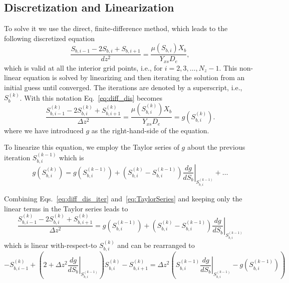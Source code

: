 \documentclass[letterpaper, twoside]{article}
\newcommand{\ie}{i.e.}
\begin{document}
\subsection{Discretization and Linearization}
To solve it we use the direct, finite-difference method, which leads to the following discretized equation
\begin{equation} \label{eq:diff_dis}
  \frac{ S_{b,i-1} - 2 S_{b,i} + S_{b,i+1}}{dz^2} = \frac{\mu(S_{b,i}) X_b}{Y_{xs} D_e},
\end{equation}
which is valid at all the interior grid points, \ie, for $i=2,3,\dots,N_z-1$. 
This non-linear equation is solved by linearizing and then iterating the solution from an initial guess until converged.
The iterations are denoted by a superscript, \ie, $S_{b}^{(k)}$.  With this notation Eq.~\ref{eq:diff_dis} becomes
\begin{equation} \label{eq:diff_dis_iter}
  \frac{ S_{b,i-1}^{(k)} - 2 S_{b,i}^{(k)} + S_{b,i+1}^{(k)}}{\Delta z^2} = \frac{\mu\left(S_{b,i}^{(k)}\right) X_b}{Y_{xs} D_e} =  g\left(S_{b,i}^{(k)}\right).
\end{equation}
where we have introduced $g$ as the right-hand-side of the equation.

To linearize this equation, we employ the Taylor series of $g$ about the previous iteration $S_{b,i}^{(k-1)}$ which is
\begin{equation}\label{eq:TaylorSeries}
  g\left(S_{b,i}^{(k)}\right) =   g\left(S_{b,i}^{(k-1)}\right) + \left( S_{b,i}^{(k)} - S_{b,i}^{(k-1)}\right) \left.\frac{d g}{d S_b}\right|_{S_{b,i}^{(k-1)}} + \dots
\end{equation}

Combining Eqs.~\ref{eq:diff_dis_iter} and~\ref{eq:TaylorSeries} and keeping only the linear terms in the Taylor series leads to
\begin{equation} \label{eq:diff_linear}
  \frac{ S_{b,i-1}^{(k)} - 2 S_{b,i}^{(k)} + S_{b,i+1}^{(k)}}{\Delta z^2} =  g\left(S_{b,i}^{(k-1)}\right) + \left( S_{b,i}^{(k)} - S_{b,i}^{(k-1)}\right) \left.\frac{d g}{d S_b}\right|_{S_{b,i}^{(k-1)}} 
\end{equation}
which is linear with-respect-to $S_{b,i}^{(k)}$ and can be rearranged to
\begin{equation}
  \label{eq:diff_final}
  -S_{b,i-1}^{(k)} + \left( 2 +\Delta z^2\left.\frac{d g}{d S_b}\right|_{S_{b,i}^{(k-1)}}\right) S_{b,i}^{(k)} - S_{b,i+1}^{(k)}
  = \Delta z^2\left( S_{b,i}^{(k-1)} \left.\frac{d g}{d S_b}\right|_{S_{b,i}^{(k-1)}} - g\left(S_{b,i}^{(k-1)}\right)\right) 
\end{equation}
\end{document}
